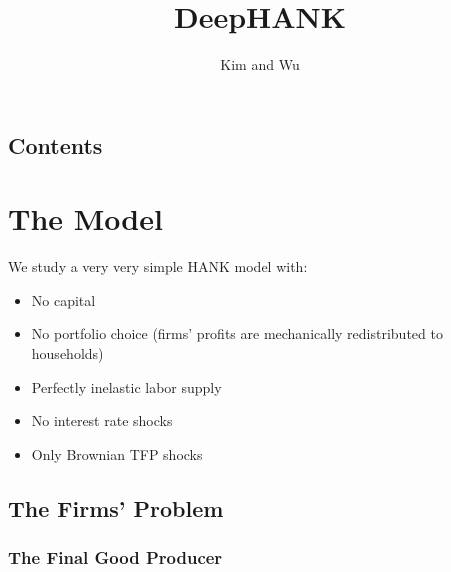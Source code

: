 \documentclass[notitlepage,a4paper,11pt]{report}
\makeatletter
\let\reportmaketitle=\maketitle
\renewcommand{\maketitle}{\begingroup\let\footnote=\thanks \reportmaketitle\endgroup}
\numberwithin{section}{chapter}
\numberwithin{subsection}{section}
\def\tableofcontents{\section*{Contents}\@starttoc{toc}}
\makeatother
\begin{document}
\pagestyle{fancy}
\fancyhf{}
\onehalfspacing


\title{\huge DeepHANK}
\author{Kim and Wu}

\maketitle

\tableofcontents



\chapter{The Model}


We study a very very simple HANK model with: 
\begin{itemize}
\item No capital

\item No portfolio choice (firms' profits are mechanically redistributed to households) 

\item Perfectly inelastic labor supply

\item No interest rate shocks

\item Only Brownian TFP shocks
\end{itemize}



\vspace{1cm}

\section{The Firms' Problem}

\subsection{The Final Good Producer}
\end{document}
